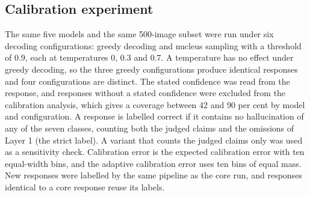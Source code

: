 \subsection{Calibration experiment}\label{sec:setup_calibration}
The same five models and the same 500-image subset were run under six decoding configurations: greedy decoding and nucleus sampling with a threshold of 0.9, each at temperatures 0, 0.3 and 0.7. A temperature has no effect under greedy decoding, so the three greedy configurations produce identical responses and four configurations are distinct. The stated confidence was read from the response, and responses without a stated confidence were excluded from the calibration analysis, which gives a coverage between 42 and 90 per cent by model and configuration. A response is labelled correct if it contains no hallucination of any of the seven classes, counting both the judged claims and the omissions of Layer 1 (the strict label). A variant that counts the judged claims only was used as a sensitivity check. Calibration error is the expected calibration error with ten equal-width bins, and the adaptive calibration error uses ten bins of equal mass. New responses were labelled by the same pipeline as the core run, and responses identical to a core response reuse its labels.


